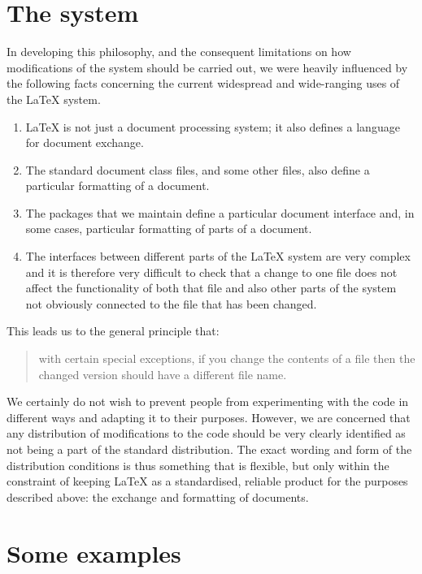 \documentclass{ltxguide}[1995/11/28]
\begin{document}
\section{The system}
\label{sec:sys}

In developing this philosophy, and the consequent limitations on how
modifications of the system should be carried out, we were heavily
influenced by the following facts concerning the current widespread
and wide-ranging uses of the \LaTeX{} system.
\begin{enumerate}
\item  \LaTeX{} is not just a document processing system;
  it also defines a language for document exchange.

\item The standard document class files, and some other files, also
  define a particular formatting of a document.

\item  The packages that we maintain define a particular document
  interface and, in some cases, particular formatting of parts of a
  document. 
  
\item The interfaces between different parts of the \LaTeX{} system
  are very complex and it is therefore very difficult to check that a
  change to one file does not affect the functionality of both that
  file and also other parts of the system not obviously connected to
  the file that has been changed.
\end{enumerate}

This leads us to the general principle that:
\begin{quote}
  with certain special exceptions, if you change the contents of a
  file then the changed version should have a different file name.
\end{quote}

We certainly do not wish to prevent people from experimenting with the
code in different ways and adapting it to their purposes.  However, we
are concerned that any distribution of modifications to the code
should be very clearly identified as not being a part of the standard
distribution.  The exact wording and form of the distribution
conditions is thus something that is flexible, but only within the
constraint of keeping \LaTeX{} as a standardised, reliable product for
the purposes described above: the exchange and formatting of
documents.


\section{Some examples}
\label{sec:expl}
\end{document}
